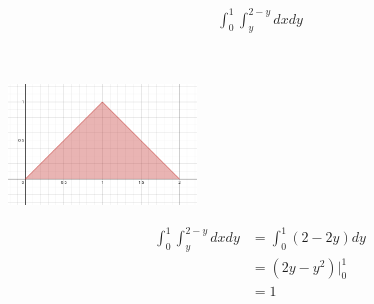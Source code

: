 \begin{align*}
    \int_{0}^{1} \int_{y}^{2-y} dx dy
\end{align*}

\begin{solution} \
    \begin{center}
        \includegraphics[width=0.375\textwidth]{img/e2p1.png}
    \end{center}
    
    \begin{align*}
        \int_{0}^{1} \int_{y}^{2-y} dx dy &= \int_{0}^{1} (2-2y) dy \\
        &= \left(2y - y^2\right)\bigg|_{0}^{1} \\
        &= 1
    \end{align*}
\end{solution}